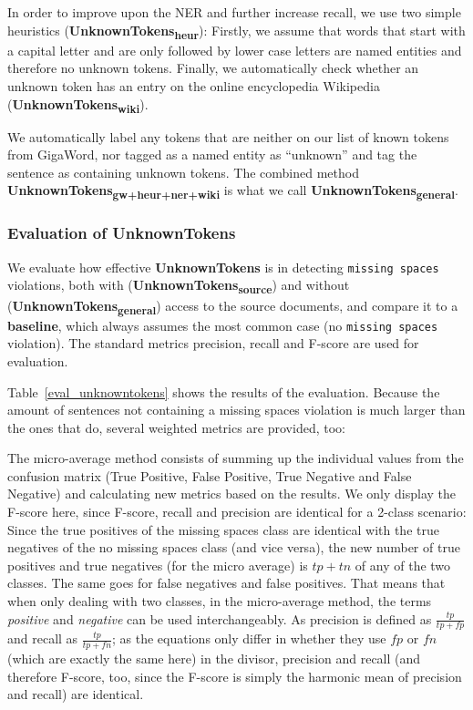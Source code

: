 \documentclass[a4paper,10pt]{scrartcl}
\theoremstyle{style}
\newcommand{\comment}[1]{
\todo[bordercolor=todoorange!80!black,color=todoorange]{\textbf{Comment:} #1}
}
\begin{document}
In order to improve upon the NER and further increase recall, we use two simple heuristics (\textbf{UnknownTokens\textsubscript{heur}}): Firstly, we assume that words that start with a capital letter and are only followed by lower case letters are named entities and therefore no unknown tokens. Finally, we automatically check whether an unknown token has an entry on the online encyclopedia Wikipedia (\textbf{UnknownTokens\textsubscript{wiki}}).

We automatically label any tokens that are neither on our list of known tokens from GigaWord, nor tagged as a named entity as ``unknown'' and tag the sentence as containing unknown tokens. The combined method \textbf{UnknownTokens\textsubscript{gw+heur+ner+wiki}} is what we call \textbf{UnknownTokens\textsubscript{general}}.

\subsubsection{Evaluation of UnknownTokens}
We evaluate how effective \textbf{UnknownTokens} is in detecting \texttt{missing spaces} violations, both with (\textbf{UnknownTokens\textsubscript{source}}) and without (\textbf{UnknownTokens\textsubscript{general}}) access to the source documents, and compare it to a \textbf{baseline}, which always assumes the most common case (no \texttt{missing spaces} violation).
The standard metrics precision, recall and F-score are used for evaluation.

Table~\ref{eval_unknowntokens} shows the results of the evaluation. %
Because the amount of sentences not containing a missing spaces violation is much larger than the ones that do, several weighted metrics are provided, too:

The micro-average method consists of summing up the individual values from the confusion matrix (True Positive, False Positive, True Negative and False Negative) and calculating new metrics based on the results. We only display the F-score here, since F-score, recall and precision are identical for a 2-class scenario: Since the true positives of the missing spaces class are identical with the true negatives of the no missing spaces class (and vice versa), the new number of true positives and true negatives (for the micro average) is $tp + tn$ of any of the two classes. The same goes for false negatives and false positives. That means that when only dealing with two classes, in the micro-average method, the terms \textit{positive} and \textit{negative} can be used interchangeably. As precision is defined as $\frac{tp}{tp+fp}$ and recall as $\frac{tp}{tp+fn}$; as the equations only differ in whether they use $fp$ or $fn$ (which are exactly the same here) in the divisor, precision and recall (and therefore F-score, too, since the F-score is simply the harmonic mean of precision and recall) are identical.
\end{document}
